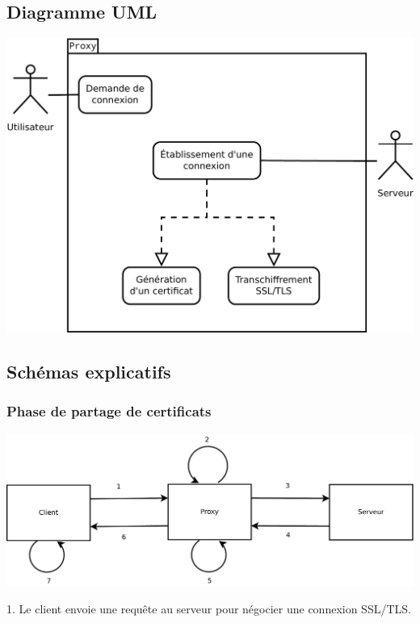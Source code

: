 \documentclass[a4paper,11pt,french]{article}
\begin{document}
\subsection{Diagramme UML}
\begin{center}
\includegraphics[width=\textwidth]{images/cas_utilisation.pdf}
\end{center}
\normalsize

\subsection{Schémas explicatifs}

\subsubsection{Phase de partage de certificats}

\begin{center}
\includegraphics[width=\textwidth]{images/Certificats.pdf}
\end{center}

1. Le client envoie une requête au serveur pour négocier une connexion SSL/TLS.
\end{document}
